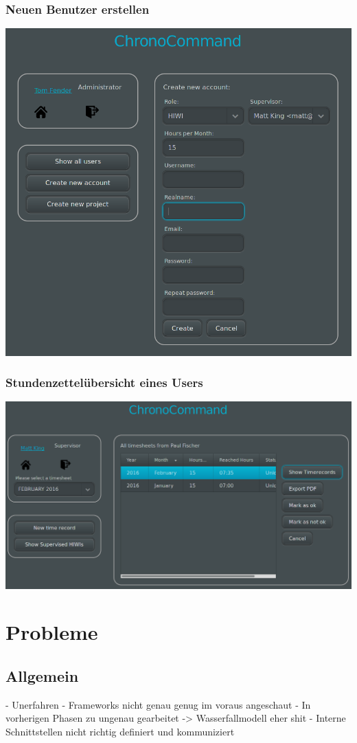 \begin{frame}
	\frametitle{Neuen Benutzer erstellen}
	\includegraphics{images/create-user.png}
\end{frame}

\begin{frame}
	\frametitle{Stundenzettelübersicht eines Users}
	\includegraphics{images/timesheets-overview.png}
\end{frame}


\section{Probleme}

\subsection{Allgemein}
- Unerfahren
- Frameworks nicht genau genug im voraus angeschaut
- In vorherigen Phasen zu ungenau gearbeitet
-> Wasserfallmodell eher shit
- Interne Schnittstellen nicht richtig definiert und kommuniziert

